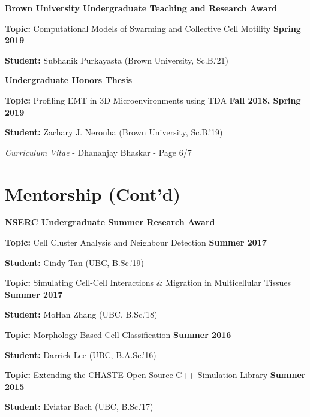 \documentclass[margin,line]{res}
\newenvironment{list1}{
  \begin{list}{\ding{113}}{
      \setlength{\itemsep}{0in}
      \setlength{\parsep}{0in} \setlength{\parskip}{0in}
      \setlength{\topsep}{0in} \setlength{\partopsep}{0in}
      \setlength{\leftmargin}{0.17in}}}{\end{list}}
\begin{document}
\begin{resume}
{\bf Brown University Undergraduate Teaching and Research Award}
\vspace*{.3cm}
\begin{list1}
\setlength\itemsep{0.2em}
\item[] {\bf Topic:} Computational Models of Swarming and Collective Cell Motility \hfill {\bf \small Spring 2019}
\item[] {\bf Student:} Subhanik Purkayasta (Brown University, Sc.B.'21)
\end{list1}

{\bf Undergraduate Honors Thesis}
\vspace*{.3cm}
\begin{list1}
\setlength\itemsep{0.2em}
\item[] {\bf Topic:} Profiling EMT in 3D Microenvironments using TDA \hfill {\bf \small Fall 2018, Spring 2019}
\item[] {\bf Student:} Zachary J. Neronha (Brown University, Sc.B.'19) 
\end{list1}

\newpage
\begin{flushright}
\textit{Curriculum Vitae} - Dhananjay Bhaskar - Page 6/7
\end{flushright}

\section{\sc Mentorship (Cont'd)}

{\bf NSERC Undergraduate Summer Research Award}
\vspace*{.3cm}
\begin{list1}
\setlength\itemsep{0.2em}
\item[] {\bf Topic:} Cell Cluster Analysis and Neighbour Detection \hfill {\bf \small Summer 2017}
\item[] {\bf Student:} Cindy Tan (UBC, B.Sc.'19) 
\end{list1}
\vspace*{.3cm}
\begin{list1}
\setlength\itemsep{0.2em}
\item[] {\bf Topic:} Simulating Cell-Cell Interactions \& Migration in Multicellular Tissues \hfill {\bf \small Summer 2017}
\item[] {\bf Student:} MoHan Zhang (UBC, B.Sc.'18)
\end{list1}
\vspace*{.3cm}
\begin{list1}
\setlength\itemsep{0.2em}
\item[] {\bf Topic:} Morphology-Based Cell Classification \hfill {\bf \small Summer 2016}
\item[] {\bf Student:} Darrick Lee (UBC, B.A.Sc.'16)
\end{list1}
\vspace*{.3cm}
\begin{list1}
\setlength\itemsep{0.2em}
\item[] {\bf Topic:} Extending the CHASTE Open Source C++ Simulation Library \hfill {\bf \small Summer 2015}
\item[] {\bf Student:} Eviatar Bach (UBC, B.Sc.'17)
\end{list1}


\end{resume}
\end{document}
